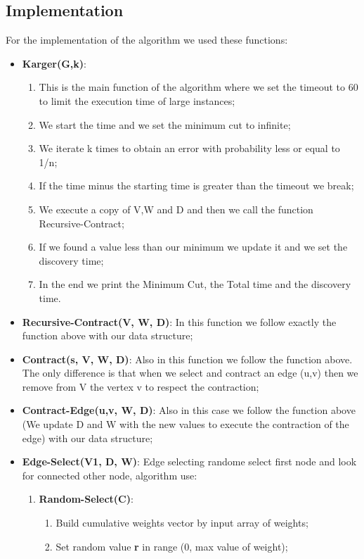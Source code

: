 \subsection{Implementation}
For the implementation of the algorithm we used these functions:
\begin{itemize}
	\item  \textbf{Karger(G,k)}: 
		\begin{enumerate}
		\item  This is the main function of the algorithm where we set the timeout to 60 to limit the execution time of large instances;
		\item  We start the time and we set the minimum cut to infinite;
		\item  We iterate k times to obtain an error with probability less or equal to 1/n;
		\item  If the time minus the starting time is greater than the timeout we break;
		\item  We execute a copy of V,W and D and then we call the function Recursive-Contract;
		\item  If we found a value less than our minimum we update it  and we set the discovery time;
		\item  In the end we print the Minimum Cut, the Total time and the discovery time.
		\end{enumerate}
	\item  \textbf{Recursive-Contract(V, W, D)}: In this function we follow exactly the function above with our data structure;
	\item  \textbf{Contract(s, V,  W, D)}: Also in this function we follow the function above. The only difference is that when we select and contract an edge (u,v) then we remove from V the vertex v to respect the contraction;
	\item  \textbf{Contract-Edge(u,v, W, D)}: Also in this case we follow the function above (We update D and W with the new values to execute the contraction of the edge) with our data structure;
	\item  \textbf{Edge-Select(V1, D, W)}: Edge selecting randome select first node and look for connected other node, algorithm use:
	\begin{enumerate}
		\item  \textbf{Random-Select(C)}:
			\begin{enumerate}
			\item  Build cumulative weights vector by input array of weights;
			\item  Set random value \textbf{r} in range (0, max value of weight);

\end{enumerate}
\end{enumerate}
\end{itemize}
